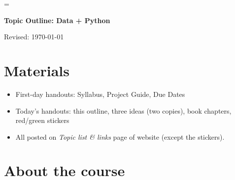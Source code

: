 \documentclass[11pt]{article}
\begin{document}
\parskip=\bigskipamount
\parindent=0.0in
\thispagestyle{empty}


\bigskip\bigskip
\centerline{\Large \bf Topic Outline:  Data + Python}
\centerline{Revised: \today}


\section*{Materials}

\begin{itemize}
\item  First-day handouts:  Syllabus, Project Guide, Due Dates
\item  Today's handouts:  this outline, three ideas (two copies), book chapters, red/green stickers
\item  All posted on {\it Topic list \& links\/} page of website (except the stickers).
\end{itemize}



\section*{About the course}
\end{document}
